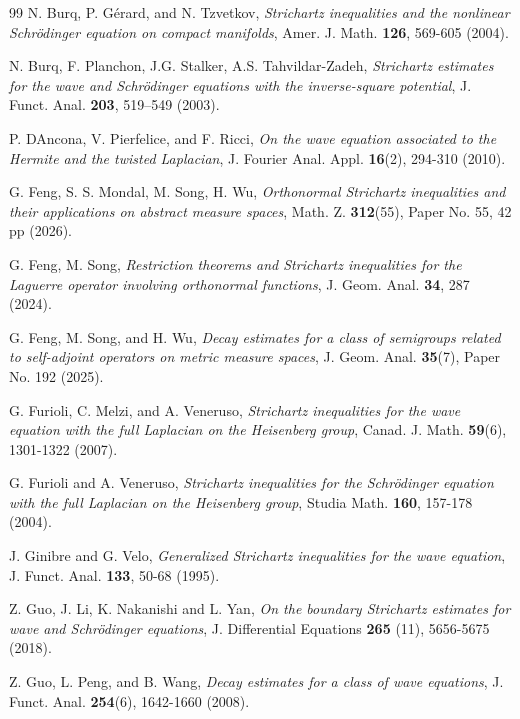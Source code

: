 \documentclass[a4paper,11pt, reqno]{amsart}
\numberwithin{equation}{section}
\theoremstyle{plain}
\theoremstyle{definition}
\theoremstyle{remark}
\begin{document}
\begin{thebibliography}{99}
\label{BGT2004} N. Burq, P. G\'{e}rard, and N. Tzvetkov, \emph{Strichartz inequalities and the nonlinear Schr\"odinger equation on
compact manifolds}, Amer. J. Math. \textbf{126}, 569-605 (2004).

 N. Burq, F. Planchon, J.G. Stalker, A.S. Tahvildar-Zadeh, 
\emph{Strichartz estimates for the wave and Schrödinger equations with the inverse-square potential}, J. Funct. Anal. \textbf{203}, 519--549 (2003).


\label{DPR2010} P. DAncona, V. Pierfelice, and F. Ricci, \emph{On the wave equation associated to the Hermite and the twisted Laplacian}, J. Fourier Anal. Appl. \textbf{16}(2), 294-310 (2010).

G. Feng, S. S. Mondal, M. Song, H. Wu, \emph{Orthonormal Strichartz inequalities and their applications on abstract measure spaces}, Math. Z. \textbf{312}(55), Paper No. 55, 42 pp (2026).

\label{Feng-Song} G. Feng, M. Song, \emph{Restriction theorems and Strichartz inequalities for the Laguerre operator involving orthonormal functions}, J. Geom. Anal. \textbf{34}, 287 (2024).

\label{FSW} G. Feng, M. Song, and H. Wu, \emph{Decay estimates for a class of semigroups related to self-adjoint operators on metric measure spaces}, J. Geom. Anal. \textbf{35}(7), Paper No. 192 (2025).

\label{FMV1}G. Furioli, C. Melzi, and A. Veneruso, \emph{Strichartz inequalities for the wave equation with the full Laplacian on the Heisenberg group},  Canad. J. Math. \textbf{59}(6), 1301-1322 (2007).

\label{FV} G. Furioli and A. Veneruso, \emph{Strichartz inequalities for the Schr\"{o}dinger equation with the full Laplacian on the Heisenberg group}, Studia Math. \textbf{160}, 157-178 (2004).

J. Ginibre and  G. Velo, \emph{Generalized Strichartz inequalities for the wave equation}, J. Funct. Anal. \textbf{133}, 50-68 (1995).

  Z. Guo, J. Li, K. Nakanishi and L. Yan, \emph{On the boundary Strichartz estimates for wave and Schr\"odinger equations}, J. Differential Equations \textbf{265} (11), 5656-5675 (2018).

 Z. Guo, L. Peng, and B. Wang, \emph{Decay estimates for a class of wave equations}, J. Funct. Anal. \textbf{254}(6), 1642-1660 (2008).


\end{thebibliography}
\end{document}
